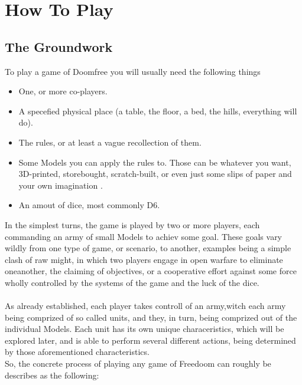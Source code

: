 \documentclass[a4paper,12pt]{book}
\begin{document}
\chapter{How To Play}

\section {The Groundwork}
To play a game of Doomfree you will usually need the following things

\begin{adjustwidth}{-2cm}{-2cm}
\begin{multicols}{3}
\begin{itemize}

	\item One, or more co-players.
	\item A specefied physical place (a table, the floor, a bed, the hills, everything will do).
	\item The rules, or at least a vague recollection of them.
	\item Some Models you can apply the rules to. Those can be whatever you want, 3D-printed, storebought, scratch-built, or even just some slips of paper and your own imagination .
	\item An amout of dice, most commonly D6.
	
\end{itemize}
\end{multicols}
\end{adjustwidth}


In the simplest turns, the game is played by two or more  players, each commanding an army of small Models to achiev some goal. These goals vary wildly from one type of game, or scenario, to another, examples being a simple clash of raw might, in which two players engage in open warfare to eliminate oneanother, the claiming of objectives, or a cooperative effort against some force wholly controlled by the systems of the game and the luck of the dice.\\
\\

As already established, each player takes controll of an army,witch each army being comprized of so called units, and they, in turn, being comprized out of the individual Models. Each unit has its own unique characeristics, which will be explored later, and is able to perform several different actions,  being determined by those aforementioned characteristics.\\
\newpage
So, the concrete process of playing any game of Freedoom can roughly be describes as the following:\\
\end{document}
